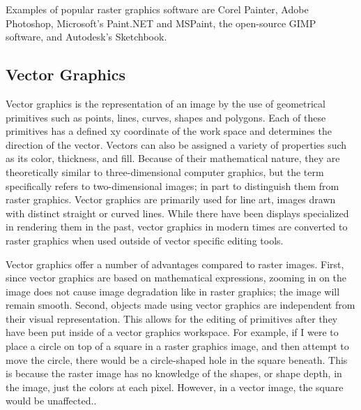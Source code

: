 \documentclass[12pt]{report}
\newcommand{\comment}[1]{}
\begin{document}
Examples of popular raster graphics software are Corel Painter, Adobe Photoshop, Microsoft's Paint.NET and MSPaint, the open-source GIMP software, and Autodesk's Sketchbook.

\comment{\subsubsection{Sketchbook Pro} http://www.autodesk.com/products/sketchbook-pro/features/all/gallery-view

Sketchbook Pro is a pixel drawing software application. It was originally made by Alias Systems Corporation, but is now owned and produced by Autodesk. Sketchbook is intended to simulate real-world art techniques such as pencil sketching, airbrushing, and painting.}

\subsection{Vector Graphics}

Vector graphics is the representation of an image by the use of geometrical primitives such as points, lines, curves, shapes and polygons.
Each of these primitives has a defined xy coordinate of the work space and determines the direction of the vector. 
Vectors can also be assigned a variety of properties such as its color, thickness, and fill.
Because of their mathematical nature, they are theoretically similar to three-dimensional computer graphics, but the term specifically refers to two-dimensional images; in part to distinguish them from raster graphics.
Vector graphics are primarily used for line art, images drawn with distinct straight or curved lines.
While there have been displays specialized in rendering them in the past, vector graphics in modern times are converted to raster graphics when used outside of vector specific editing tools.  

Vector graphics offer a number of advantages compared to raster images. 
First, since vector graphics are based on mathematical expressions, zooming in on the image does not cause image degradation like in raster graphics; the image will remain smooth. 
Second, objects made using vector graphics are independent from their visual representation.
This allows for the editing of primitives after they have been put inside of a vector graphics workspace.
For example, if I were to place a circle on top of a square in a raster graphics image, and then attempt to move the circle, there would be a circle-shaped hole in the square beneath.
This is because the raster image has no knowledge of the shapes, or shape depth, in the image, just the colors at each pixel.
However, in a vector image, the square would be unaffected..
\end{document}
